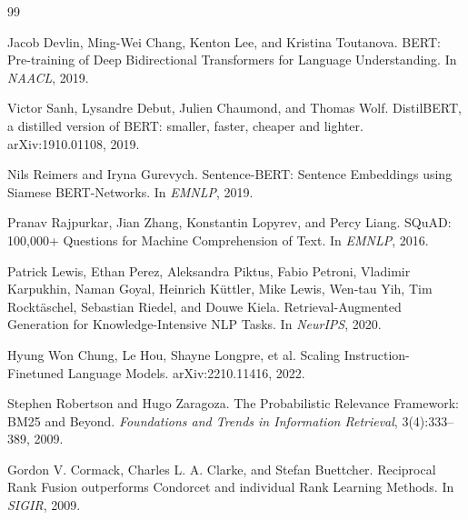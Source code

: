 \documentclass[11pt,a4paper]{article}
\begin{document}
\begin{thebibliography}{99}

Jacob Devlin, Ming-Wei Chang, Kenton Lee, and Kristina Toutanova.
\newblock BERT: Pre-training of Deep Bidirectional Transformers for Language Understanding.
\newblock In \emph{NAACL}, 2019.

Victor Sanh, Lysandre Debut, Julien Chaumond, and Thomas Wolf.
\newblock DistilBERT, a distilled version of BERT: smaller, faster, cheaper and lighter.
\newblock arXiv:1910.01108, 2019.

Nils Reimers and Iryna Gurevych.
\newblock Sentence-BERT: Sentence Embeddings using Siamese BERT-Networks.
\newblock In \emph{EMNLP}, 2019.

Pranav Rajpurkar, Jian Zhang, Konstantin Lopyrev, and Percy Liang.
\newblock SQuAD: 100,000+ Questions for Machine Comprehension of Text.
\newblock In \emph{EMNLP}, 2016.

Patrick Lewis, Ethan Perez, Aleksandra Piktus, Fabio Petroni, Vladimir Karpukhin, Naman Goyal, Heinrich Küttler, Mike Lewis, Wen-tau Yih, Tim Rockt{ä}schel, Sebastian Riedel, and Douwe Kiela.
\newblock Retrieval-Augmented Generation for Knowledge-Intensive NLP Tasks.
\newblock In \emph{NeurIPS}, 2020.

Hyung Won Chung, Le Hou, Shayne Longpre, et al.
\newblock Scaling Instruction-Finetuned Language Models.
\newblock arXiv:2210.11416, 2022.

Stephen Robertson and Hugo Zaragoza.
\newblock The Probabilistic Relevance Framework: BM25 and Beyond.
\newblock \emph{Foundations and Trends in Information Retrieval}, 3(4):333--389, 2009.

Gordon V. Cormack, Charles L. A. Clarke, and Stefan Buettcher.
\newblock Reciprocal Rank Fusion outperforms Condorcet and individual Rank Learning Methods.
\newblock In \emph{SIGIR}, 2009.

\end{thebibliography}
\end{document}
